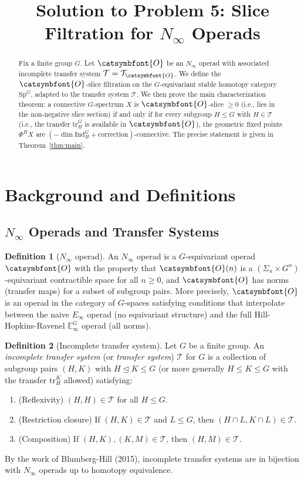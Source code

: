 \documentclass[12pt]{article}
\title{Solution to Problem 5: Slice Filtration for $N_\infty$ Operads}
\author{}
\date{}
\theoremstyle{definition}
\newtheorem{definition}{Definition}
\newcommand{\aO}{{\catsymbfont{O}}}
\begin{document}
\maketitle

\begin{abstract}
Fix a finite group $G$. Let $\aO$ be an $N_\infty$ operad with associated incomplete transfer system $\mathcal{T} = \mathcal{T}_\aO$. We define the $\aO$-slice filtration on the $G$-equivariant stable homotopy category $\mathrm{Sp}^G$, adapted to the transfer system $\mathcal{T}$. We then prove the main characterization theorem: a connective $G$-spectrum $X$ is $\aO$-slice $\geq 0$ (i.e., lies in the non-negative slice section) if and only if for every subgroup $H\leq G$ with $H\in\mathcal{T}$ (i.e., the transfer $\mathrm{tr}_H^G$ is available in $\aO$), the geometric fixed points $\Phi^H X$ are $(−\dim\mathrm{Ind}_H^G + \text{correction})$-connective. The precise statement is given in Theorem~\ref{thm:main}.
\end{abstract}

\section{Background and Definitions}

\subsection{$N_\infty$ Operads and Transfer Systems}

\begin{definition}[$N_\infty$ operad]
An $N_\infty$ operad is a $G$-equivariant operad $\aO$ with the property that $\aO(n)$ is a $(\Sigma_n\times G^n)$-equivariant contractible space for all $n\geq 0$, and $\aO$ has norms (transfer maps) for a subset of subgroup pairs. More precisely, $\aO$ is an operad in the category of $G$-spaces satisfying conditions that interpolate between the naive $E_\infty$ operad (no equivariant structure) and the full Hill-Hopkins-Ravenel $\mathbb{E}_\infty^G$ operad (all norms).
\end{definition}

\begin{definition}[Incomplete transfer system]
Let $G$ be a finite group. An \emph{incomplete transfer system} (or \emph{transfer system}) $\mathcal{T}$ for $G$ is a collection of subgroup pairs $(H,K)$ with $H\trianglelefteq K\leq G$ (or more generally $H\leq K\leq G$ with the transfer $\mathrm{tr}_H^K$ allowed) satisfying:
\begin{enumerate}
\item (Reflexivity) $(H,H)\in\mathcal{T}$ for all $H\leq G$.
\item (Restriction closure) If $(H,K)\in\mathcal{T}$ and $L\leq G$, then $(H\cap L, K\cap L)\in\mathcal{T}$.
\item (Composition) If $(H,K),(K,M)\in\mathcal{T}$, then $(H,M)\in\mathcal{T}$.
\end{enumerate}
By the work of Blumberg-Hill (2015), incomplete transfer systems are in bijection with $N_\infty$ operads up to homotopy equivalence.
\end{definition}
\end{document}
